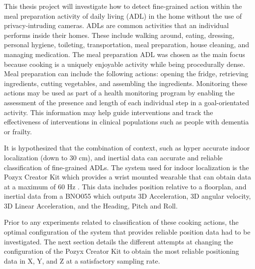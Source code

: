 This thesis project will investigate how to detect fine-grained action within the meal preparation activity of daily living 
(ADL) in the home without the use of privacy-intruding cameras. ADLs are common activities that an individual 
performs inside their homes. These include walking around, eating, dressing, personal hygiene, toileting, 
transportation, meal preparation, house cleaning, and managing medication. The meal preparation ADL was chosen as the 
main focus because cooking is a uniquely enjoyable activity while being procedurally dense. Meal preparation can include 
the following actions: opening the fridge, retrieving ingredients, cutting vegetables, and assembling the ingredients. 
Monitoring these actions may be used as part of a health monitoring program by enabling the assessment of the presence and 
length of each individual step in a goal-orientated activity. This information may help guide interventions and track 
the effectiveness of interventions in clinical populations such as people with dementia or frailty. 


It is hypothesized that the combination of context, such as hyper accurate 
indoor localization (down to 30 cm), and inertial data can accurate and reliable 
classification of fine-grained ADLs. 
The system used for indoor localization is the Pozyx Creator Kit which provides a wrist mounted 
wearable that can obtain data at a maximum of 60 Hz \cite{noauthor_creator_nodate}. This data includes position relative to a 
floorplan, and inertial data from a BNO055 which outputs 3D Acceleration, 3D angular velocity, 
3D Linear Acceleration, and the Heading, Pitch and Roll.

Prior to any experiments related to classification of these cooking actions, the optimal 
configuration of the system that provides reliable position data had to be investigated. 
The next section details the different attempts at changing the configuration of the Pozyx 
Creator Kit to obtain the most reliable positioning data in X, Y, and Z at a satisfactory 
sampling rate. 
